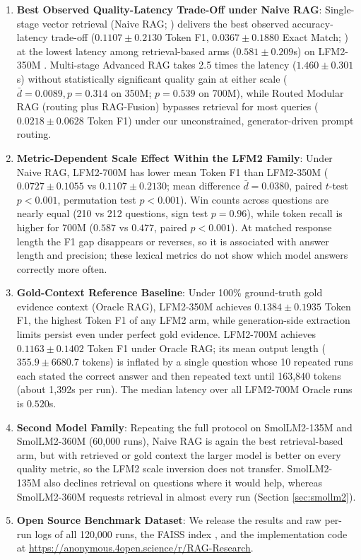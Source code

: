 \documentclass[10pt]{article}
\def\openreview{\url{https://anonymous.4open.science/r/RAG-Research}}
\begin{document}
\begin{enumerate}
    \item \textbf{Best Observed Quality-Latency Trade-Off under Naive RAG}: Single-stage vector retrieval (Naive RAG; \citealp{lewis2020retrieval}) delivers the best observed accuracy-latency trade-off ($0.1107 \pm 0.2130$ Token F1, $0.0367 \pm 0.1880$ Exact Match; \citealp{rajpurkar2016squad}) at the lowest latency among retrieval-based arms ($0.581 \pm 0.209$s) on LFM2-350M \citep{liquid2024lfm}. Multi-stage Advanced RAG takes 2.5 times the latency ($1.460 \pm 0.301$s) without statistically significant quality gain at either scale ($\bar{d}=0.0089, p=0.314$ on 350M; $p=0.539$ on 700M), while Routed Modular RAG (routing plus RAG-Fusion) bypasses retrieval for most queries ($0.0218 \pm 0.0628$ Token F1) under our unconstrained, generator-driven prompt routing.
    \item \textbf{Metric-Dependent Scale Effect Within the LFM2 Family}: Under Naive RAG, LFM2-700M has lower mean Token F1 than LFM2-350M ($0.0727 \pm 0.1055$ vs $0.1107 \pm 0.2130$; mean difference $\bar{d}=0.0380$, paired $t$-test $p < 0.001$, permutation test $p < 0.001$). Win counts across questions are nearly equal (210 vs 212 questions, sign test $p=0.96$), while token recall is higher for 700M ($0.587$ vs $0.477$, paired $p<0.001$). At matched response length the F1 gap disappears or reverses, so it is associated with answer length and precision; these lexical metrics do not show which model answers correctly more often.
    \item \textbf{Gold-Context Reference Baseline}: Under 100\% ground-truth gold evidence context (Oracle RAG), LFM2-350M achieves $0.1384 \pm 0.1935$ Token F1, the highest Token F1 of any LFM2 arm, while generation-side extraction limits persist even under perfect gold evidence. LFM2-700M achieves $0.1163 \pm 0.1402$ Token F1 under Oracle RAG; its mean output length ($355.9 \pm 6680.7$ tokens) is inflated by a single question whose 10 repeated runs each stated the correct answer and then repeated text until 163,840 tokens (about 1,392s per run). The median latency over all LFM2-700M Oracle runs is $0.520$s.
    \item \textbf{Second Model Family}: Repeating the full protocol on SmolLM2-135M and SmolLM2-360M (60,000 runs), Naive RAG is again the best retrieval-based arm, but with retrieved or gold context the larger model is better on every quality metric, so the LFM2 scale inversion does not transfer. SmolLM2-135M also declines retrieval on questions where it would help, whereas SmolLM2-360M requests retrieval in almost every run (Section \ref{sec:smollm2}).
    \item \textbf{Open Source Benchmark Dataset}: We release the results and raw per-run logs of all 120,000 runs, the FAISS index \citep{johnson2019billion}, and the implementation code at \openreview.
\end{enumerate}
\end{document}

